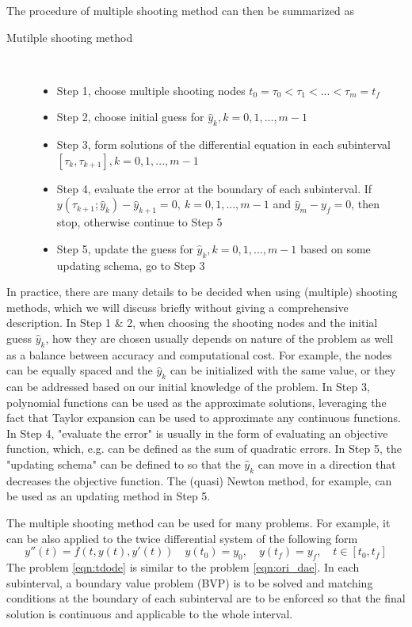 \documentclass  [
  paper    = a4,
  BCOR     = 10mm,
  twoside,
  fontsize = 12pt,
  fleqn,
  toc      = bibnumbered,
  toc      = listofnumbered,
  numbers  = noendperiod,
  headings = normal,
  listof   = leveldown,
  version  = 3.03
]                                       {scrreprt}
\newcommand{\<}{\langle}
\renewcommand{\>}{\rangle}
\begin{document}
The procedure of multiple shooting method can then be summarized as
\begin{description}
	\item[Mutilple shooting method] \
	\begin{itemize}
		\item Step 1, choose multiple shooting nodes $t_0 = \tau_0 < \tau_1 < ... < \tau_m = t_f$ 
		\item Step 2, choose initial guess for $\hat{y}_k, k = 0, 1, ..., m-1$ 
		\item Step 3, form solutions of the differential equation in each subinterval $[\tau_k, \tau_{k+1}], k = 0, 1, ..., m-1$
		\item Step 4, evaluate the error at the boundary of each subinterval. If $y(\tau_{k+1}; \hat{y}_k) - \hat{y}_{k+1} = 0, \  k = 0, 1, ..., m-1$ and $\hat{y}_{m} - y_f =0$, then stop, otherwise continue to Step 5
		\item Step 5, update the guess for $\hat{y}_k, k = 0, 1, ..., m-1$ based on some updating schema, go to Step 3
	\end{itemize}
\end{description}

In practice, there are many details to be decided when using (multiple) shooting methods, which we will discuss briefly without giving a comprehensive description. In Step 1 \& 2, when choosing the shooting nodes and the initial guess $\hat{y}_k$, how they are chosen usually depends on nature of the problem as well as a balance between accuracy and computational cost. For example, the nodes can be equally spaced and the $\hat{y}_k$ can be initialized with the same value, or they can be addressed based on our initial knowledge of the problem. In Step 3, polynomial functions can be used as the approximate solutions, leveraging the fact that Taylor expansion can be used to approximate any continuous functions. In Step 4, "evaluate the error" is usually in the form of evaluating an objective function, which, e.g. can be defined as the sum of quadratic errors. In Step 5, the "updating schema" can be defined to so that the $\hat{y}_k$ can move in a direction that decreases the objective function. The (quasi) Newton method, for example, can be used as an updating method in Step 5. 


The multiple shooting method can be used for many problems. For example, it can be also  applied to the twice differential system of the following form 
\begin{equation}
	y''(t) = f(t, y(t), y'(t))  \quad y(t_0) = y_0, \quad y(t_f) = y_f,  \quad t \in [t_0, t_f]
	\label{eqn:tdode}
\end{equation}
The problem \ref{eqn:tdode} is similar to the problem \ref{eqn:ori_dae}. In each subinterval, a boundary value problem (BVP) is to be solved and matching conditions at the boundary of each subinterval are to be enforced so that the final solution is continuous and applicable to the whole interval. 
\end{document}
